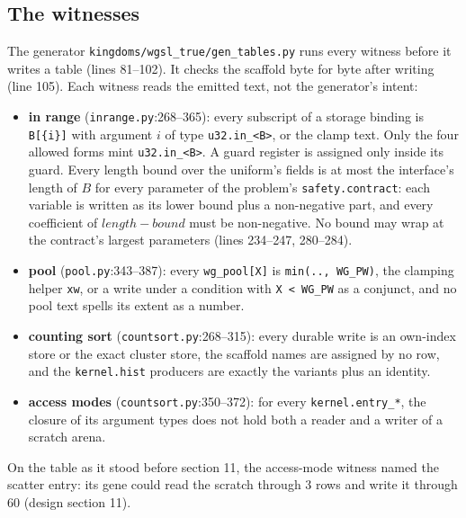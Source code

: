 \documentclass[sigconf,nonacm]{acmart}
\newcommand{\code}[1]{\nolinkurl{#1}}
\newcommand{\src}[1]{{\footnotesize\nolinkurl{#1}}}
\begin{document}
\subsection{The witnesses}
\label{sec:witness}
The generator \src{kingdoms/wgsl_true/gen_tables.py} runs every witness before
it writes a table (lines 81--102). It checks the scaffold byte for byte after
writing (line 105). Each witness reads the emitted text, not the generator's
intent:
\begin{itemize}
\item \textbf{in range} (\src{inrange.py}:268--365): every subscript of a
  storage binding is \texttt{B[\{i\}]} with argument $i$ of type \code{u32.in_<B>},
  or the clamp text. Only the four allowed forms mint \code{u32.in_<B>}. A guard
  register is assigned only inside its guard. Every length bound over the
  uniform's fields is at most the interface's length of $B$ for every parameter
  of the problem's \code{safety.contract}: each variable is written as its lower
  bound plus a non-negative part, and every coefficient of
  $\mathit{length}-\mathit{bound}$ must be non-negative. No bound may wrap at
  the contract's largest parameters (lines 234--247, 280--284).
\item \textbf{pool} (\src{pool.py}:343--387): every \code{wg_pool[X]} is
  \code{min(.., WG_PW)}, the clamping helper \code{xw}, or a write under a
  condition with \code{X < WG_PW} as a conjunct, and no pool text spells its
  extent as a number.
\item \textbf{counting sort} (\src{countsort.py}:268--315): every durable
  write is an own-index store or the exact cluster store, the scaffold names
  are assigned by no row, and the \code{kernel.hist} producers are exactly the
  variants plus an identity.
\item \textbf{access modes} (\src{countsort.py}:350--372): for every
  \code{kernel.entry_*}, the closure of its argument types does not hold both a
  reader and a writer of a scratch arena.
\end{itemize}
On the table as it stood before section 11, the access-mode witness named
the scatter entry: its gene could read the scratch through 3 rows and write
it through 60 (design section 11).
\end{document}
